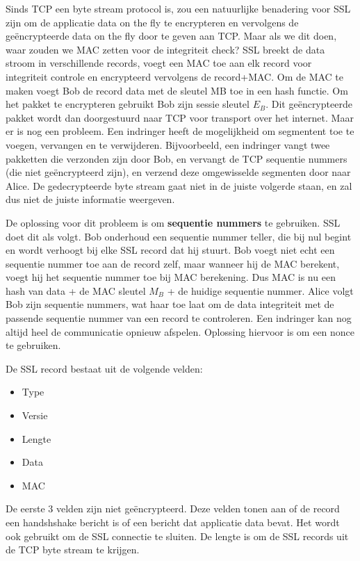Sinds TCP een byte stream protocol is, zou een natuurlijke benadering voor SSL zijn om de applicatie data on the fly te encrypteren en vervolgens de geëncrypteerde data on the fly door te geven aan TCP. Maar als we dit doen, waar zouden we MAC zetten voor de integriteit check?
SSL breekt de data stroom in verschillende records, voegt een MAC toe aan elk record voor integriteit controle en encrypteerd vervolgens de record+MAC. Om de MAC te maken voegt Bob de record data met de sleutel MB toe in een hash functie. Om het pakket te encrypteren gebruikt Bob zijn sessie sleutel $E_B$. Dit geëncrypteerde pakket wordt dan doorgestuurd naar TCP voor transport over het internet.
Maar er is nog een probleem. Een indringer heeft de mogelijkheid om segmentent toe te voegen, vervangen en te verwijderen. Bijvoorbeeld, een indringer vangt twee pakketten die verzonden zijn door Bob, en vervangt de TCP sequentie nummers (die niet geëncrypteerd zijn), en verzend deze omgewisselde segmenten door naar Alice.
De gedecrypteerde byte stream gaat niet in de juiste volgerde staan, en zal dus niet de juiste informatie weergeven.

De oplossing voor dit probleem is om \textbf{sequentie nummers} te gebruiken. SSL doet dit als volgt. Bob onderhoud een sequentie nummer teller, die bij nul begint en wordt verhoogt bij elke SSL record dat hij stuurt. Bob voegt niet echt een sequentie nummer toe aan de record zelf, maar wanneer hij de MAC berekent, voegt hij het sequentie nummer toe bij MAC berekening. Dus MAC is nu een hash van data + de MAC sleutel $M_B$ + de huidige sequentie nummer.
Alice volgt Bob zijn sequentie nummers, wat haar toe laat om de data integriteit met de passende sequentie nummer van een record te controleren.
Een indringer kan nog altijd heel de communicatie opnieuw afspelen. Oplossing hiervoor is om een nonce te gebruiken.

\clearpage


De SSL record bestaat uit de volgende velden:
\begin{itemize}

\item Type
\item Versie
\item Lengte
\item Data
\item MAC
\end{itemize}

De eerste 3 velden zijn niet geëncrypteerd. Deze velden tonen aan of de record een handshshake bericht is of een bericht dat applicatie data bevat. Het wordt ook gebruikt om de SSL connectie te sluiten. De lengte is om de SSL records uit de TCP byte stream te krijgen.

